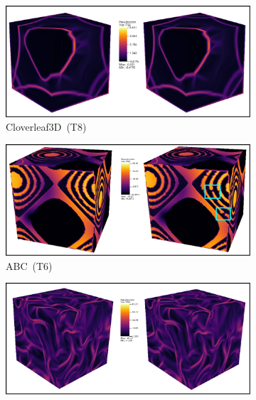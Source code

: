 \begin{figure}[!h]
\begin{subfigure}{\linewidth}
\centering
\includegraphics[width=1\linewidth,keepaspectratio]{Images/clover_ftle.pdf}
\vspace{-5mm}
\caption{Cloverleaf3D~(T8)}
\label{clover_ftle}
\end{subfigure}
\begin{subfigure}{\linewidth}
\centering
\includegraphics[width=1\linewidth,keepaspectratio]{Images/abc_ftle.pdf}
\vspace{-5mm}
\caption{ABC~(T6)}
\label{abc_ftle}
\end{subfigure}
\begin{subfigure}{\linewidth}
\centering
\includegraphics[width=1\linewidth,keepaspectratio]{Images/nyx_ftle.pdf}

\end{subfigure}
\end{figure}
